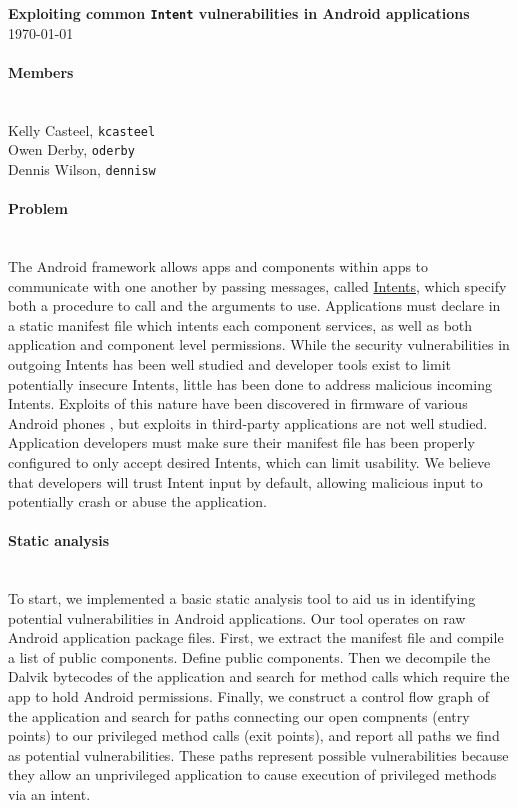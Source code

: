 \documentclass[12pt,a4paper]{article} \usepackage{verbatim}
\begin{document}
 

\flushleft\textbf{Exploiting common \texttt{Intent} vulnerabilities in Android %
applications}\\ \today\\

\paragraph{Members} ~\\

Kelly Casteel, \texttt{kcasteel}\\
Owen Derby, \texttt{oderby}\\
Dennis Wilson, \texttt{dennisw}\\

\paragraph{Problem} ~\\ The Android framework allows apps and components within
apps to communicate with one another by passing messages, called
\href{https://developer.android.com/reference/android/content/Intent.html}{Intents},
which specify both a procedure to call and the arguments to use. Applications
must declare in a static manifest file which intents each component services, as
well as both application and component level permissions. While the security
vulnerabilities in outgoing Intents has been well studied
\cite{chin_analyzing_2011} and developer tools exist to limit potentially
insecure Intents, little has been done to address malicious incoming Intents.
Exploits of this nature have been discovered in firmware of various Android
phones \cite{grace_systematic_2012}, but exploits in third-party applications
are not well studied. Application developers must make sure their manifest file
has been properly configured to only accept desired Intents, which can limit
usability. We believe that developers will trust Intent input by default,
allowing malicious input to potentially crash or abuse the application.

\paragraph{Static analysis} ~\\

To start, we implemented a basic static analysis tool to aid us in identifying
potential vulnerabilities in Android applications. Our tool operates on raw Android
application package files. First, we extract the manifest file and compile a
list of public components. Define public components. Then we decompile the
Dalvik bytecodes of the application and search for method calls which require
the app to hold Android permissions. Finally, we construct a control flow graph
of the application and search for paths connecting our open compnents (entry
points) to our privileged method calls (exit points), and report all paths we
find as potential vulnerabilities. These paths represent possible
vulnerabilities because they allow an unprivileged application to cause
execution of privileged methods via an intent.
\end{document}
